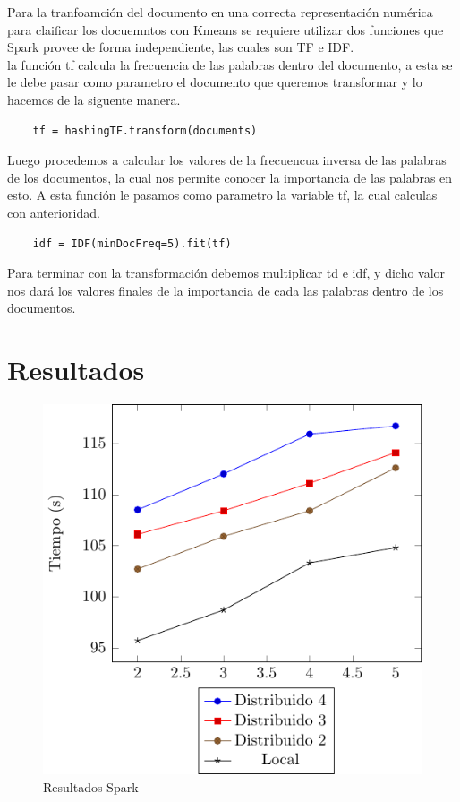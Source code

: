 \documentclass[conference,compsoc]{IEEEtran}
\begin{document}
Para la tranfoamción del documento en una correcta representación numérica para
claificar los docuemntos con Kmeans se requiere utilizar dos funciones que
Spark provee de forma independiente, las cuales son TF e IDF.\\

la función tf calcula la frecuencia de las palabras dentro del documento, a
esta se le debe pasar como parametro el documento que queremos transformar y lo
hacemos de la siguente manera.\\

\begin{lstlisting}
    tf = hashingTF.transform(documents)
\end{lstlisting}

\vspace{0.5cm}

Luego procedemos a calcular los valores de la frecuencua inversa de las
palabras de los documentos, la cual nos permite conocer la importancia de las
palabras en esto. A esta función le pasamos como parametro la variable tf, la
cual calculas con anterioridad.\\

\begin{lstlisting}
    idf = IDF(minDocFreq=5).fit(tf)
\end{lstlisting}

\vspace{0.5cm}

Para terminar con la transformación debemos multiplicar td e idf, y dicho valor
nos dará los valores finales de la importancia de cada las palabras dentro de
los documentos.

\section{Resultados}

\begin{figure}[H]
    \centering
    \includegraphics[scale=1]{ResultsSpark.pdf}
    \caption{Resultados Spark}
\end{figure}
\end{document}

